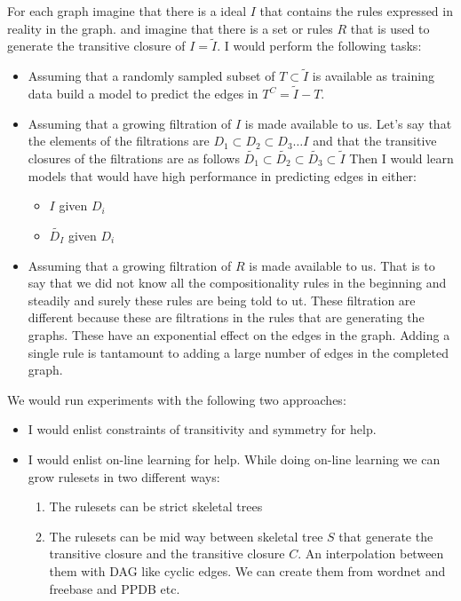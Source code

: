 \documentclass[12pt]{exam} %
\begin{document}
\begin{questions}
{    For each graph imagine that there is a ideal $I$ that contains the
    rules expressed in reality in the graph. and imagine that there is
    a set or rules $R$ that is used to generate the transitive closure
    of $I = \tilde{I}$. I would perform the following tasks:

    \begin{itemize}
    \item Assuming that a randomly sampled subset of $T \subset \tilde{I}$ is available
      as training data build a model to predict the edges in $T^C =
      \tilde{I} - T$.
    \item Assuming that a growing filtration of $I$ is made available
      to us. Let's say that the elements of the filtrations are $D_1
      \subset D_2 \subset D_3\ldots I$ and that the transitive
      closures of the filtrations are as follows
      $\tilde{D_1} \subset \tilde{D_2} \subset \tilde{D_3} \subset
      \tilde{I}$
      Then I would learn models that would have high performance in
      predicting edges in either:
      \begin{itemize}
      \item $I$ given $D_i$
      \item $\tilde{D_I}$ given $D_i$
      \end{itemize}
    \item Assuming that a growing filtration of $R$ is made available
      to us. That is to say that we did not know all the
      compositionality rules in the beginning and steadily and surely
      these rules are being told to ut.
      These filtration are different because these are
      filtrations in the rules that are generating the graphs.
      These have an exponential effect on the edges in the graph.
      Adding a single rule is tantamount to adding a large number of
      edges in the completed graph.
    \end{itemize}

We would run experiments with the following two approaches:
\begin{itemize}
\item I would enlist constraints of transitivity and symmetry for help.
\item I would enlist on-line learning for help. While doing on-line
  learning we can grow rulesets in two different ways:
  \begin{enumerate}
  \item The rulesets can be strict skeletal trees
  \item The rulesets can be mid way between skeletal tree $S$ that generate
    the transitive closure and the transitive closure $C$. An
    interpolation between them with DAG like cyclic edges.
    We can create them from wordnet and freebase and PPDB etc.
  \end{enumerate}
\end{itemize}

}
\end{questions}
\end{document}
